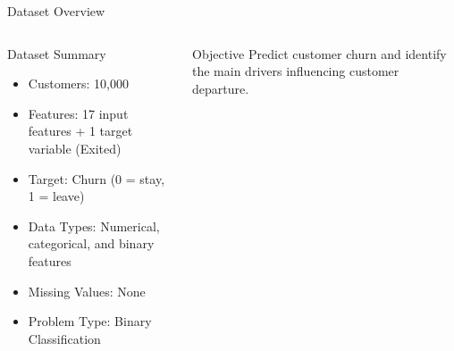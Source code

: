 \begin{frame}{Dataset Overview}

\begin{columns}


\begin{block}{Dataset Summary}
\begin{itemize}
    \item Customers: 10,000
    \item Features: 17 input features + 1 target variable (Exited)
    \item Target: Churn (0 = stay, 1 = leave)
    \item Data Types: Numerical, categorical, and binary features
    \item Missing Values: None
    \item Problem Type: Binary Classification
\end{itemize}
\end{block}


\begin{block}{Objective}
Predict customer churn and identify the main drivers influencing customer departure.
\end{block}

\end{columns}

\end{frame}

